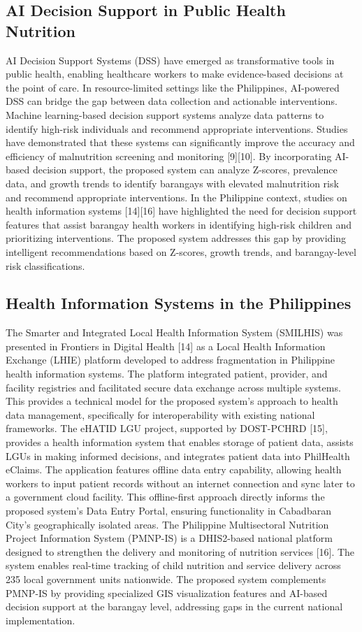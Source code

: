 \documentclass[12pt, a4paper]{report}
\begin{document}
\subsection{AI Decision Support in Public Health Nutrition}
AI Decision Support Systems (DSS) have emerged as transformative tools in public health, enabling healthcare workers to make evidence-based decisions at the point of care. In resource-limited settings like the Philippines, AI-powered DSS can bridge the gap between data collection and actionable interventions.
Machine learning-based decision support systems analyze data patterns to identify high-risk individuals and recommend appropriate interventions. Studies have demonstrated that these systems can significantly improve the accuracy and efficiency of malnutrition screening and monitoring [9][10]. By incorporating AI-based decision support, the proposed system can analyze Z-scores, prevalence data, and growth trends to identify barangays with elevated malnutrition risk and recommend appropriate interventions.
In the Philippine context, studies on health information systems [14][16] have highlighted the need for decision support features that assist barangay health workers in identifying high-risk children and prioritizing interventions. The proposed system addresses this gap by providing intelligent recommendations based on Z-scores, growth trends, and barangay-level risk classifications.

\subsection{Health Information Systems in the Philippines}
The Smarter and Integrated Local Health Information System (SMILHIS) was presented in Frontiers in Digital Health [14] as a Local Health Information Exchange (LHIE) platform developed to address fragmentation in Philippine health information systems. The platform integrated patient, provider, and facility registries and facilitated secure data exchange across multiple systems. This provides a technical model for the proposed system's approach to health data management, specifically for interoperability with existing national frameworks.
The eHATID LGU project, supported by DOST-PCHRD [15], provides a health information system that enables storage of patient data, assists LGUs in making informed decisions, and integrates patient data into PhilHealth eClaims. The application features offline data entry capability, allowing health workers to input patient records without an internet connection and sync later to a government cloud facility. This offline-first approach directly informs the proposed system's Data Entry Portal, ensuring functionality in Cabadbaran City's geographically isolated areas.
The Philippine Multisectoral Nutrition Project Information System (PMNP-IS) is a DHIS2-based national platform designed to strengthen the delivery and monitoring of nutrition services [16]. The system enables real-time tracking of child nutrition and service delivery across 235 local government units nationwide. The proposed system complements PMNP-IS by providing specialized GIS visualization features and AI-based decision support at the barangay level, addressing gaps in the current national implementation.
\end{document}
